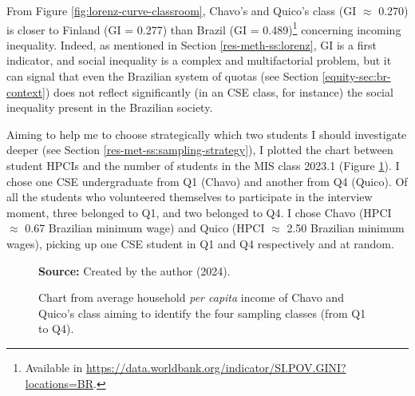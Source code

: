 From Figure \ref{fig:lorenz-curve-classroom}, Chavo's and Quico's class (\acrfull{GI} $\approx$ 0.270) is closer to Finland (\gls{GI} = 0.277) than Brazil (\gls{GI} = 0.489)\footnote{Available in \url{https://data.worldbank.org/indicator/SI.POV.GINI?locations=BR}.} concerning incoming inequality. Indeed, as mentioned in Section \ref{res-meth-ss:lorenz}, \gls{GI} is a first indicator, and social inequality is a complex and multifactorial problem, but it can signal that even the Brazilian system of quotas (see Section \ref{equity-sec:br-context}) does not reflect significantly (in an \acrfull{CSE} class, for instance) the social inequality present in the Brazilian society.

Aiming to help me to choose strategically which two students I should investigate deeper (see Section \ref{res-met-ss:sampling-strategy}), I plotted the chart between student \acrfull{HPCI}s and the number of students in the \gls{MIS} class 2023.1 (Figure \ref{fig:sampling-classes-ds-sef}). I chose one \gls{CSE} undergraduate from \gls{Q}1 (Chavo) and another from \gls{Q}4 (Quico). Of all the students who volunteered themselves to participate in the interview moment, three belonged to \gls{Q}1, and two belonged to \gls{Q}4. I chose Chavo (\gls{HPCI} $\approx$ 0.67 Brazilian minimum wage) and Quico (\gls{HPCI} $\approx$ 2.50 Brazilian minimum wages), picking up one \gls{CSE} student in \gls{Q}1 and \gls{Q}4 respectively and at random.

\begin{figure}[ht!]
\centering

\caption{\textmd{Chart from average household \textit{per capita} income of Chavo and Quico’s class aiming to identify the four sampling classes (from \acrshort{Q}1 to \acrshort{Q}4).}}
\label{fig:sampling-classes-ds-sef}

\par\medskip\ABNTEXfontereduzida\selectfont\textbf{Source:} Created by the author (2024).%
\end{figure}

